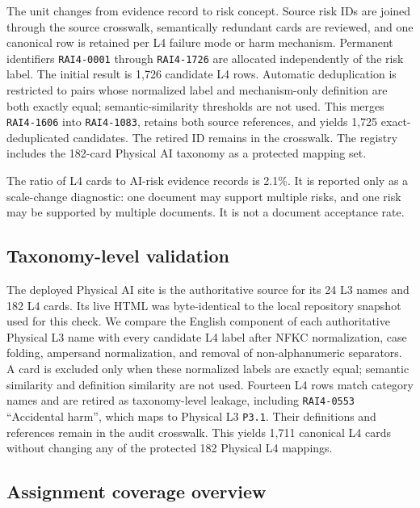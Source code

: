\documentclass[11pt,a4paper]{article}
\newcommand{\code}[1]{\texttt{#1}}
\begin{document}
The unit changes from evidence record to risk concept. Source risk IDs are
joined through the source crosswalk, semantically redundant cards are reviewed,
and one canonical row is retained per L4 failure mode or harm mechanism.
Permanent identifiers \code{RAI4-0001} through \code{RAI4-1726} are allocated
independently of the risk label. The initial result is 1,726 candidate L4 rows. Automatic
deduplication is restricted to pairs whose normalized label and mechanism-only
definition are both exactly equal; semantic-similarity thresholds are not used.
This merges \code{RAI4-1606} into \code{RAI4-1083}, retains both source references,
and yields 1,725 exact-deduplicated candidates. The retired ID remains in the
crosswalk. The registry includes the 182-card Physical AI taxonomy as a
protected mapping set.

The ratio of L4 cards to AI-risk evidence records is 2.1\%. It is reported only
as a scale-change diagnostic: one document may support multiple risks, and one
risk may be supported by multiple documents. It is not a document acceptance
rate.

\subsection{Taxonomy-level validation}

The deployed Physical AI site is the authoritative source for its 24 L3 names
and 182 L4 cards. Its live HTML was byte-identical to the local repository
snapshot used for this check. We compare the English component of each
authoritative Physical L3 name with every candidate L4 label after NFKC
normalization, case folding, ampersand normalization, and removal of
non-alphanumeric separators. A card is excluded only when these normalized
labels are exactly equal; semantic similarity and definition similarity are not
used. Fourteen L4 rows match category names and are retired as taxonomy-level
leakage, including \code{RAI4-0553} ``Accidental harm'', which maps to Physical
L3 \code{P3.1}. Their definitions and references remain in the audit crosswalk.
This yields 1,711 canonical L4 cards without changing any of the protected 182
Physical L4 mappings.

\subsection{Assignment coverage overview}
\end{document}
